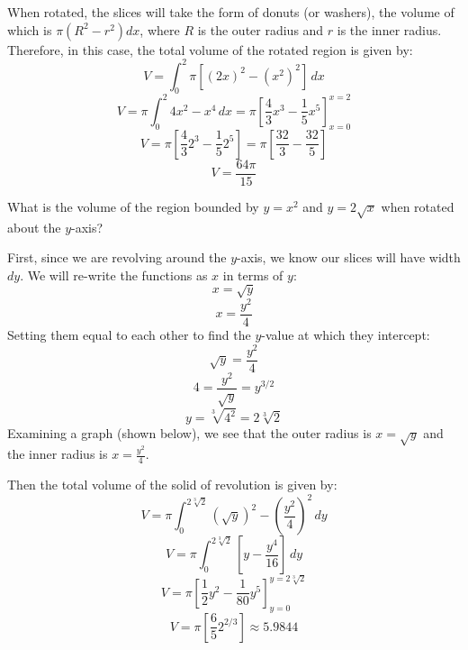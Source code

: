 When rotated, the slices will take the form of donuts (or washers), the volume 
of which is $\pi \left( R^2 - r^2 \right) dx$, where $R$ is the outer radius 
and $r$ is the inner radius. Therefore, in this case, the total volume of the 
rotated region is given by:
$$V = \int_0^2 \pi \left[ \left( 2x \right)^2 - \left(x^2 \right)^2 \right]\,
dx$$
$$V = \pi \int_0^2 4x^2 - x^4\,dx = \pi \left[\frac{4}{3}x^3 - \frac{1}{5}x^5 
\right]_{x = 0}^{x = 2}$$
$$V = \pi \left[\frac{4}{3}2^3 - \frac{1}{5}2^5 \right] = \pi \left[ \frac{32}{
3} - \frac{32}{5} \right] $$
$$V = \frac{64 \pi}{15} $$

\begin{Exercise}[label = volume2]
What is the volume of the region bounded by $y = x^2$ and $y = 2\sqrt{x}$ when 
rotated about the $y$-axis? 
\vspace{75mm}
\end{Exercise}

\begin{Answer}[ref = volume 2]
First, since we are revolving around the $y$-axis, we know our slices will 
have width $dy$. We will re-write the functions as $x$ in terms of $y$:
$$x = \sqrt{y}$$
$$x = \frac{y^2}{4}$$
Setting them equal to each other to find the $y$-value at which they intercept:
$$\sqrt{y} = \frac{y^2}{4}$$
$$4 = \frac{y^2}{\sqrt{y}} = y^{3/2}$$
$$y = \sqrt[3]{4^2} = 2\sqrt[3]{2}$$
Examining a graph (shown below), we see that the outer radius is $x = \sqrt{y}$
and the inner radius is $x = \frac{y^2}{4}$. 


Then the total volume of the solid of revolution is given by:
$$V = \pi \int_0^{2\sqrt[3]{2}} \left(\sqrt{y} \right)^2 - \left( \frac{y^2}{4} 
\right)^2\,dy$$
$$V = \pi \int_0^{2\sqrt[3]{2}} \left[ y - \frac{y^4}{16} \right]\,dy$$
$$V = \pi \left[ \frac{1}{2}y^2 - \frac{1}{80}y^5 \right]_{y = 0}^{y = 
2\sqrt[3]{2}}$$
$$V = \pi \left[ \frac{6}{5} 2^{2/3} \right] \approx 5.9844$$
\end{Answer}

